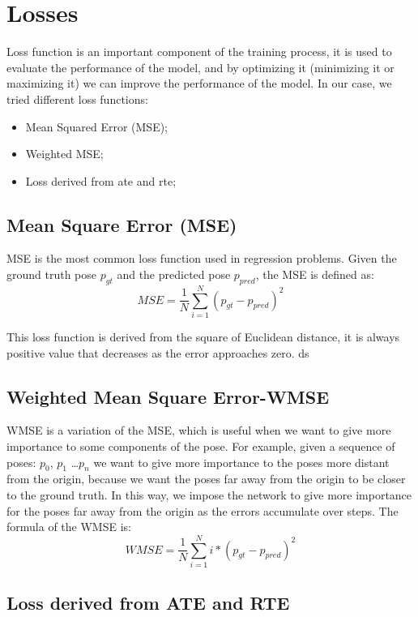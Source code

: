 \section{Losses}\label{sec:losses}
Loss function is an important component of the training process, it is used to evaluate the performance of the model, and by optimizing it (minimizing it or maximizing it) we can improve the performance of the model.
In our case, we tried different loss functions:
\begin{itemize}
    \item Mean Squared Error (MSE);
    \item Weighted MSE;
    \item Loss derived from \gls{ate} and \gls{rte};
\end{itemize}

\subsection{Mean Square Error (MSE)}\label{subsec:mean-square-error-(mse)}
MSE is the most common loss function used in regression problems.
Given the ground truth pose $p_{gt}$ and the predicted pose $p_{pred}$, the MSE is defined as:
\begin{equation}
    \label{eq:mean-square-error}
    MSE = \frac{1}{N} \sum_{i=1}^{N} (p_{gt} - p_{pred})^2
\end{equation}

This loss function is derived from the square of Euclidean distance, it is always positive value that decreases as the error approaches zero. ds

\subsection{Weighted Mean Square Error-WMSE}\label{subsec:weighted-mean-square-error-wmse}
WMSE is a variation of the MSE, which is useful when we want to give more importance to some components of the pose.
For example, given a sequence of poses: $p_0$, $p_1$ \dots $p_n$ we want to give more importance to the poses more distant from the origin, because we want the poses far away from the origin to be closer to the ground truth.
In this way, we impose the network to give more importance for the poses far away from the origin as the errors accumulate over steps.
The formula of the WMSE is:
\begin{equation}
    \label{eq:weighted-mean-square-error}
    WMSE = \frac{1}{N} \sum_{i=1}^{N} i * (p_{gt} - p_{pred})^2
\end{equation}

\subsection[ATE and RPE loss]{Loss derived from ATE and RTE}\label{subsec:loss-derived-from-ate-and-rte}


